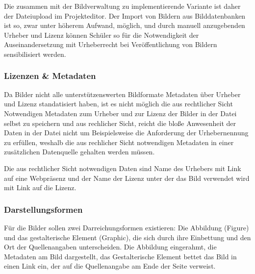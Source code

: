 Die zusammen mit der Bildverwaltung zu implementierende Variante ist daher der
Dateiupload im Projekteditor. Der Import von Bildern aus Bilddatenbanken ist so,
zwar unter höherem Aufwand, möglich, und durch manuell anzugebenden Urheber und
Lizenz können Schüler so für die Notwendigkeit der Auseinandersetzung mit
Urheberrecht bei Veröffentlichung von Bildern sensibilisiert werden.

\subsubsection{Lizenzen \& Metadaten}

Da Bilder nicht alle unterstützenswerten Bildformate Metadaten über
Urheber und Lizenz standatisiert haben, ist es nicht möglich die aus
rechtlicher Sicht Notwendigen Metadaten zum Urheber und zur Lizenz der Bilder
in der Datei selbst zu speichern und aus rechlicher Sicht, reicht die bloße
Anwesenheit der Daten in der Datei nicht um Beispielsweise die Anforderung der
Urhebernennung zu erfüllen, weshalb die aus rechlicher Sicht notwendigen
Metadaten in einer zusätzlichen Datenquelle gehalten werden müssen.

Die aus rechtlicher Sicht notwendigen Daten sind Name des Urhebers mit Link auf
eine Webpräsenz und der Name der Lizenz unter der das Bild verwendet wird
mit Link auf die Lizenz.

\subsubsection{Darstellungsformen}

Für die Bilder sollen zwei Darreichungsformen existieren: Die Abbildung
(Figure) und das gestalterische Element (Graphic), die sich durch ihre
Einbettung und den Ort der Quellenangaben unterscheiden. Die Abbildung
eingerahmt, die Metadaten am Bild dargestellt, das Gestalterische Element bettet
das Bild in einen Link ein, der auf die Quellenangabe am Ende der Seite verweist.

